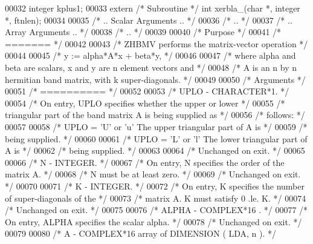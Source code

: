 \begin{DoxyCode}
00032     integer kplus1;
00033     \textcolor{keyword}{extern} \textcolor{comment}{/* Subroutine */} \textcolor{keywordtype}{int} xerbla\_(\textcolor{keywordtype}{char} *, integer *, ftnlen);
00034 
00035 \textcolor{comment}{/*     .. Scalar Arguments .. */}
00036 \textcolor{comment}{/*     .. */}
00037 \textcolor{comment}{/*     .. Array Arguments .. */}
00038 \textcolor{comment}{/*     .. */}
00039 
00040 \textcolor{comment}{/*  Purpose */}
00041 \textcolor{comment}{/*  ======= */}
00042 
00043 \textcolor{comment}{/*  ZHBMV  performs the matrix-vector  operation */}
00044 
00045 \textcolor{comment}{/*     y := alpha*A*x + beta*y, */}
00046 
00047 \textcolor{comment}{/*  where alpha and beta are scalars, x and y are n element vectors and */}
00048 \textcolor{comment}{/*  A is an n by n hermitian band matrix, with k super-diagonals. */}
00049 
00050 \textcolor{comment}{/*  Arguments */}
00051 \textcolor{comment}{/*  ========== */}
00052 
00053 \textcolor{comment}{/*  UPLO   - CHARACTER*1. */}
00054 \textcolor{comment}{/*           On entry, UPLO specifies whether the upper or lower */}
00055 \textcolor{comment}{/*           triangular part of the band matrix A is being supplied as */}
00056 \textcolor{comment}{/*           follows: */}
00057 
00058 \textcolor{comment}{/*              UPLO = 'U' or 'u'   The upper triangular part of A is */}
00059 \textcolor{comment}{/*                                  being supplied. */}
00060 
00061 \textcolor{comment}{/*              UPLO = 'L' or 'l'   The lower triangular part of A is */}
00062 \textcolor{comment}{/*                                  being supplied. */}
00063 
00064 \textcolor{comment}{/*           Unchanged on exit. */}
00065 
00066 \textcolor{comment}{/*  N      - INTEGER. */}
00067 \textcolor{comment}{/*           On entry, N specifies the order of the matrix A. */}
00068 \textcolor{comment}{/*           N must be at least zero. */}
00069 \textcolor{comment}{/*           Unchanged on exit. */}
00070 
00071 \textcolor{comment}{/*  K      - INTEGER. */}
00072 \textcolor{comment}{/*           On entry, K specifies the number of super-diagonals of the */}
00073 \textcolor{comment}{/*           matrix A. K must satisfy  0 .le. K. */}
00074 \textcolor{comment}{/*           Unchanged on exit. */}
00075 
00076 \textcolor{comment}{/*  ALPHA  - COMPLEX*16      . */}
00077 \textcolor{comment}{/*           On entry, ALPHA specifies the scalar alpha. */}
00078 \textcolor{comment}{/*           Unchanged on exit. */}
00079 
00080 \textcolor{comment}{/*  A      - COMPLEX*16       array of DIMENSION ( LDA, n ). */}

\end{DoxyCode}
